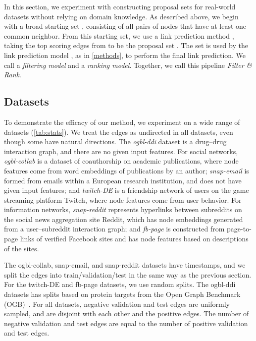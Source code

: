 \documentclass{article}
\begin{document}
In this section, we experiment with constructing proposal sets for real-world datasets without relying on domain knowledge.
As described above, we begin with a broad starting set , consisting of all pairs of nodes that have at least one common neighbor.
From this starting set, we use a link prediction method , taking the top  scoring edges from  to be the proposal set .
The set  is used by the link prediction model , as in \cref{methods}, to perform the final link prediction. 
We call  a \emph{filtering model} and  a \emph{ranking model}. 
Together, we call this pipeline \textit{Filter \& Rank}.

\subsection{Datasets} 

To demonstrate the efficacy of our method, we experiment on a wide range of datasets (\cref{tab:stats}). 
We treat the edges as undirected in all datasets, even though some have natural directions.
The \emph{ogbl-ddi} dataset is a drug--drug interaction graph, and there are no given input features.
For social networks, 
\emph{ogbl-collab} is a dataset of coauthorship on academic publications, 
where node features come from word embeddings of publications by an author;
\emph{snap-email} is formed from emails within a European research institution, 
and does not have given input features; and
\emph{twitch-DE} is a friendship network of users on the game streaming platform Twitch,
where node features come from user behavior.
For information networks,
\emph{snap-reddit} represents hyperlinks between subreddits on the social news aggregation site Reddit,
which has node embeddings generated from a user--subreddit interaction graph;
and \emph{fb-page} is constructed from page-to-page links of verified Facebook sites
and has node features based on descriptions of the sites.

The ogbl-collab, snap-email, and snap-reddit datasets have timestamps, 
and we split the edges into train/validation/test in the same way as the previous section.
For the twitch-DE and fb-page datasets, we use random splits.
The ogbl-ddi datasets has splits based on protein targets from the Open Graph Benchmark (OGB)~\cite{Hu2020OpenGB}.
For all datasets, negative validation and test edges are uniformly sampled, and are disjoint with each other and the positive edges. 
The number of negative validation and test edges are equal to the number of positive validation and test edges.
\end{document}
